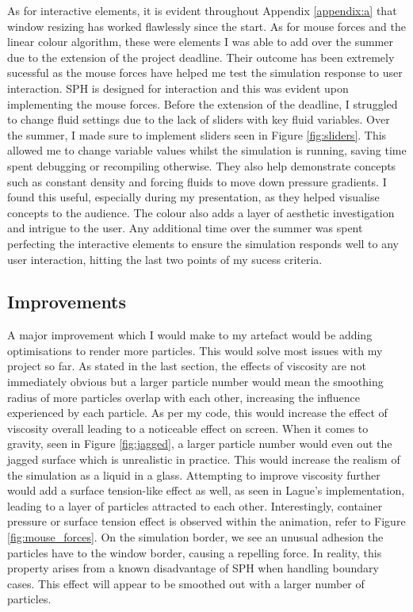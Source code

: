 \documentclass[write-up.tex]{subfiles}
\begin{document}
As for interactive elements, it is evident throughout Appendix \ref{appendix:a} that window resizing has worked flawlessly since the start. As for mouse forces and the linear colour algorithm, these were elements I was able to add over the summer due to the extension of the project deadline. Their outcome has been extremely sucessful as the mouse forces have helped me test the simulation response to user interaction. SPH is designed for interaction and this was evident upon implementing the mouse forces. Before the extension of the deadline, I struggled to change fluid settings due to the lack of sliders with key fluid variables. Over the summer, I made sure to implement sliders seen in Figure \ref{fig:sliders}. This allowed me to change variable values whilst the simulation is running, saving time spent debugging or recompiling otherwise. They also help demonstrate concepts such as constant density and forcing fluids to move down pressure gradients. I found this useful, especially during my presentation, as they helped visualise concepts to the audience. The colour also adds a layer of aesthetic investigation and intrigue to the user. Any additional time over the summer was spent perfecting the interactive elements to ensure the simulation responds well to any user interaction, hitting the last two points of my sucess criteria.
\subsection{Improvements}
A major improvement which I would make to my artefact would be adding optimisations to render more particles. This would solve most issues with my project so far. As stated in the last section, the effects of viscosity are not immediately obvious but a larger particle number would mean the smoothing radius of more particles overlap with each other, increasing the influence experienced by each particle. As per my code, this would increase the effect of viscosity overall leading to a noticeable effect on screen. When it comes to gravity, seen in Figure \ref{fig:jagged}, a larger particle number would even out the jagged surface which is unrealistic in practice. This would increase the realism of the simulation as a liquid in a glass. Attempting to improve viscosity further would add a surface tension-like effect as well, as seen in Lague's \cite{Lague} implementation, leading to a layer of particles attracted to each other. Interestingly, container pressure or surface tension effect is observed within the animation, refer to Figure \ref{fig:mouse_forces}. On the simulation border, we see an unusual adhesion the particles have to the window border, causing a repelling force. In reality, this property arises from a known disadvantage of SPH when handling boundary cases. This effect will appear to be smoothed out with a larger number of particles.
\end{document}
